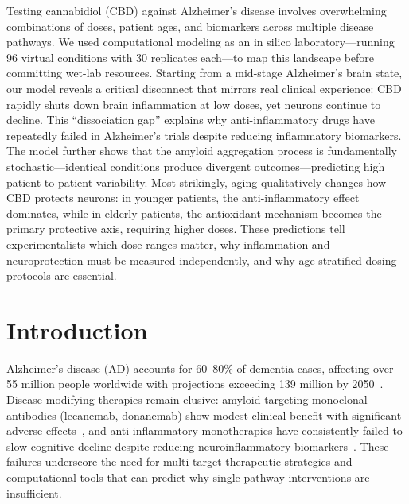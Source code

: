 \documentclass[10pt,letterpaper]{article}
\begin{document}
Testing cannabidiol (CBD) against Alzheimer's disease involves overwhelming combinations of doses, patient ages, and biomarkers across multiple disease pathways. We used computational modeling as an in silico laboratory---running 96 virtual conditions with 30 replicates each---to map this landscape before committing wet-lab resources. Starting from a mid-stage Alzheimer's brain state, our model reveals a critical disconnect that mirrors real clinical experience: CBD rapidly shuts down brain inflammation at low doses, yet neurons continue to decline. This ``dissociation gap'' explains why anti-inflammatory drugs have repeatedly failed in Alzheimer's trials despite reducing inflammatory biomarkers. The model further shows that the amyloid aggregation process is fundamentally stochastic---identical conditions produce divergent outcomes---predicting high patient-to-patient variability. Most strikingly, aging qualitatively changes how CBD protects neurons: in younger patients, the anti-inflammatory effect dominates, while in elderly patients, the antioxidant mechanism becomes the primary protective axis, requiring higher doses. These predictions tell experimentalists which dose ranges matter, why inflammation and neuroprotection must be measured independently, and why age-stratified dosing protocols are essential.

\linenumbers

\section{Introduction}
\label{sec:introduction}

Alzheimer's disease (AD) accounts for 60--80\% of dementia cases, affecting over 55 million people worldwide with projections exceeding 139 million by 2050~\cite{who2023}. Disease-modifying therapies remain elusive: amyloid-targeting monoclonal antibodies (lecanemab, donanemab) show modest clinical benefit with significant adverse effects~\cite{vandyck2023}, and anti-inflammatory monotherapies have consistently failed to slow cognitive decline despite reducing neuroinflammatory biomarkers~\cite{adapt2007,imbimbo2010}. These failures underscore the need for multi-target therapeutic strategies and computational tools that can predict why single-pathway interventions are insufficient.
\end{document}

